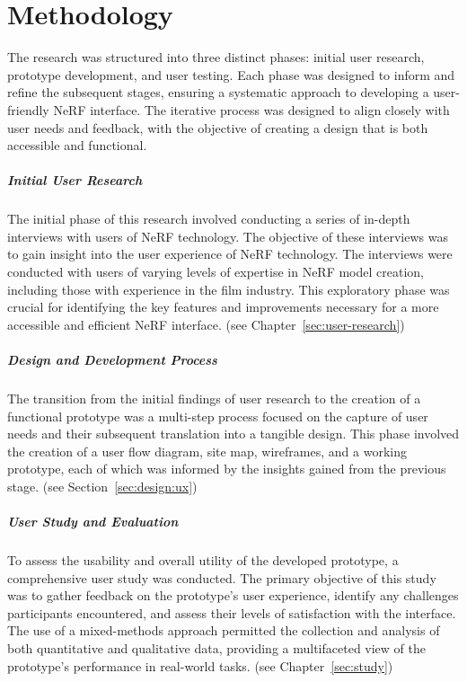%
\chapter{Methodology}
\label{sec:methodology}

The research was structured into three distinct phases: initial user research, prototype development, and user testing.
Each phase was designed to inform and refine the subsequent stages, ensuring a systematic approach to developing a user-friendly NeRF interface.
The iterative process was designed to align closely with user needs and feedback, with the objective of creating a design that is both accessible and functional.

\paragraph{Initial User Research}

The initial phase of this research involved conducting a series of in-depth interviews with users of NeRF technology.
The objective of these interviews was to gain insight into the user experience of NeRF technology.
The interviews were conducted with users of varying levels of expertise in NeRF model creation, including those with experience in the film industry.
This exploratory phase was crucial for identifying the key features and improvements necessary for a more accessible and efficient NeRF interface.
(see Chapter~\ref{sec:user-research})

\paragraph{Design and Development Process}

The transition from the initial findings of user research to the creation of a functional prototype was a multi-step process focused on the capture of user needs and their subsequent translation into a tangible design.
This phase involved the creation of a user flow diagram, site map, wireframes, and a working prototype, each of which was informed by the insights gained from the previous stage.
(see Section~\ref{sec:design:ux})

\paragraph{User Study and Evaluation}

To assess the usability and overall utility of the developed prototype, a comprehensive user study was conducted.
The primary objective of this study was to gather feedback on the prototype's user experience, identify any challenges participants encountered, and assess their levels of satisfaction with the interface.
The use of a mixed-methods approach permitted the collection and analysis of both quantitative and qualitative data, providing a multifaceted view of the prototype's performance in real-world tasks.
(see Chapter~\ref{sec:study})
